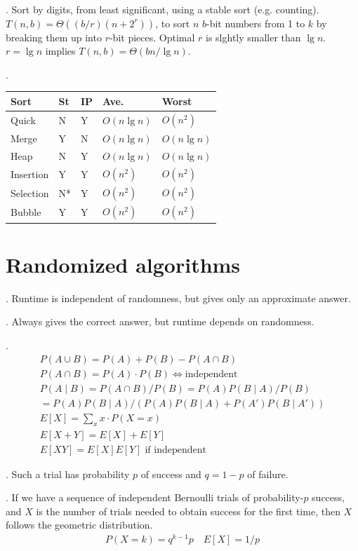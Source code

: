 \documentclass[fleqn]{slnotes}
\begin{document}
. Sort by digits, from least significant, using a stable sort (e.g. counting). \(T(n,b) = \Theta((b/r)(n+2^r))\), to sort \(n\) \(b\)-bit numbers from 1 to \(k\) by breaking them up into \(r\)-bit pieces. Optimal \(r\) is slghtly smaller than \(\lg n\). \(r = \lg n\) implies \(T(n, b) = \Theta(bn/\lg n)\).

.

\begin{tabular}{lllll}
\toprule
Sort & St & IP & Ave. & Worst \tabularnewline
\midrule
Quick & N & Y & \(O(n \lg n)\) & \(O(n^2)\) \tabularnewline
Merge & Y & N & \(O(n \lg n)\) & \(O(n \lg n)\) \tabularnewline
Heap & N & Y & \(O(n \lg n)\) & \(O(n \lg n)\) \tabularnewline
Insertion & Y & Y & \(O(n^2)\) & \(O(n^2)\) \tabularnewline
Selection & N* & Y & \(O(n^2)\) & \(O(n^2)\) \tabularnewline
Bubble & Y & Y & \(O(n^2)\) & \(O(n^2)\) \tabularnewline
\bottomrule
\end{tabular}

\chapter{Randomized algorithms}
. Runtime is independent of randomness, but gives only an approximate answer.

. Always gives the correct answer, but runtime depends on randomness.

.
\begin{gather*}
P(A \cup B) = P(A) + P(B) - P(A \cap B)\\
P(A \cap B) = P(A) \cdot P(B) \Leftrightarrow \text{independent}\\
P(A \mid B) = P(A \cap B) / P(B) = P(A)P(B\mid A)/ P(B)\\
= P(A)P(B\mid A)/(P(A)P(B\mid A) + P(A')P(B\mid A'))\\
E[X] = \sum_x x\cdot P(X = x)\\
E[X+Y] = E[X] + E[Y]\\
E[XY] = E[X]E[Y] \text{ if independent}
\end{gather*}

. Such a trial has probability \(p\) of success and \(q = 1 - p\) of failure.

. If we have a sequence of independent Bernoulli trials of probability-\(p\) success, and \(X\) is the number of trials needed to obtain success for the first time, then \(X\) follows the geometric distribution. \begin{gather*}
P(X = k) = q^{k-1}p\quad E[X] = 1/p
\end{gather*}
\end{document}
